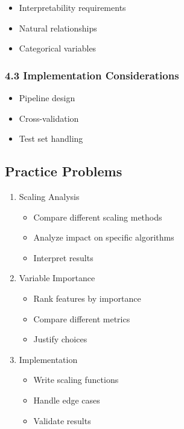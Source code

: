 \documentclass[11pt]{article}
\providecommand{\tightlist}{%
  \setlength{\itemsep}{0pt}\setlength{\parskip}{0pt}}
\begin{document}
\begin{itemize}
\tightlist
\item
  Interpretability requirements
\item
  Natural relationships
\item
  Categorical variables
\end{itemize}

\subsubsection{4.3 Implementation
Considerations}\label{implementation-considerations}

\begin{itemize}
\tightlist
\item
  Pipeline design
\item
  Cross-validation
\item
  Test set handling
\end{itemize}

\subsection{Practice Problems}\label{practice-problems}

\begin{enumerate}
\def\labelenumi{\arabic{enumi}.}
\tightlist
\item
  Scaling Analysis

  \begin{itemize}
  \tightlist
  \item
    Compare different scaling methods
  \item
    Analyze impact on specific algorithms
  \item
    Interpret results
  \end{itemize}
\item
  Variable Importance

  \begin{itemize}
  \tightlist
  \item
    Rank features by importance
  \item
    Compare different metrics
  \item
    Justify choices
  \end{itemize}
\item
  Implementation

  \begin{itemize}
  \tightlist
  \item
    Write scaling functions
  \item
    Handle edge cases
  \item
    Validate results
  \end{itemize}
\end{enumerate}
\end{document}
